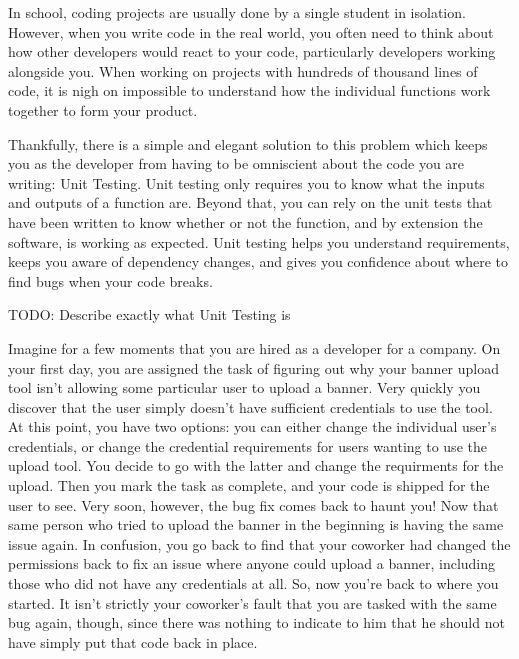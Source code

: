 

In school, coding projects are usually done by a single student in isolation.  However, when you write code in the real world, you often need to think about how other developers would react to your code, particularly developers working alongside you.
When working on projects with hundreds of thousand lines of code, it is nigh on impossible to understand how the individual functions work together to form your product.

Thankfully, there is a simple and elegant solution to this problem which keeps you as the developer from having to be omniscient about the code you are writing: Unit Testing.
Unit testing only requires you to know what the inputs and outputs of a function are.
Beyond that, you can rely on the unit tests that have been written to know whether or not the function, and by extension the software, is working as expected.
Unit testing helps you understand requirements, keeps you aware of dependency changes, and gives you confidence about where to find bugs when your code breaks.

TODO: Describe exactly what Unit Testing is

Imagine for a few moments that you are hired as a developer for a company. On your first day, you are assigned the task of figuring out why your banner upload tool isn't allowing some particular user to upload a banner.
Very quickly you discover that the user simply doesn't have sufficient credentials to use the tool. At this point, you have two options: you can either change the individual user's credentials, or change the credential requirements for users wanting to use the upload tool.
You decide to go with the latter and change the requirments for the upload. Then you mark the task as complete, and your code is shipped for the user to see.
Very soon, however, the bug fix comes back to haunt you! Now that same person who tried to upload the banner in the beginning is having the same issue again.
In confusion, you go back to find that your coworker had changed the permissions back to fix an issue where anyone could upload a banner, including those who did not have any credentials at all.
So, now you're back to where you started.  It isn't strictly your coworker's fault that you are tasked with the same bug again, though, since there was nothing to indicate to him that he should not have simply put that code back in place.

